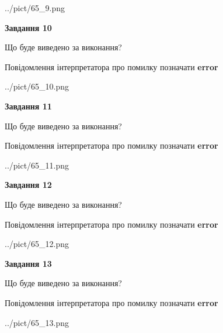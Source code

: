 \documentclass[11pt, ukrainian]{article}
\begin{document}
{\begin {large}
\begin{center}
	{../pict/65_9.png}
\end{center}
\newpage

{\begin {center}\textbf{Завдання 10}\end {center}}\par
Що буде виведено за виконання? \par
Повідомлення інтерпретатора про помилку позначати \textbf{error}

\begin{center}
	{../pict/65_10.png}
\end{center}
\newpage

{\begin {center}\textbf{Завдання 11}\end {center}}\par
Що буде виведено за виконання? \par
Повідомлення інтерпретатора про помилку позначати \textbf{error}

\begin{center}
	{../pict/65_11.png}
\end{center}
\newpage

{\begin {center}\textbf{Завдання 12}\end {center}}\par
Що буде виведено за виконання? \par
Повідомлення інтерпретатора про помилку позначати \textbf{error}

\begin{center}
	{../pict/65_12.png}
\end{center}
\newpage

{\begin {center}\textbf{Завдання 13}\end {center}}\par
Що буде виведено за виконання? \par
Повідомлення інтерпретатора про помилку позначати \textbf{error}

\begin{center}
	{../pict/65_13.png}
\end{center}
\newpage


\end{large}}
\end{document}
